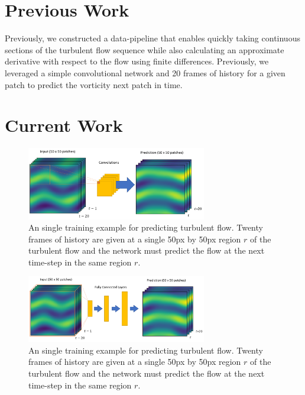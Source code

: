 \documentclass[10pt,letterpaper]{article}
\author{Brandon Houghton}
\begin{document}
	


\section{Previous Work}
Previously, we constructed a data-pipeline that enables quickly taking continuous sections of the turbulent flow sequence while also calculating an approximate derivative with respect to the flow using finite differences.
Previously, we leveraged a simple convolutional network and 20 frames of history for a given patch to predict the vorticity next patch in time. 

\section{Current Work}


\begin{figure}
	\begin{center}
		\includegraphics[width=0.7\textwidth]{images/network_conv.PNG}
		\caption{\small An single training example for predicting turbulent flow. Twenty frames of history are given at a single 50px by 50px region $r$ of the turbulent flow and the network must predict the flow at the next time-step in the same region $r$.}
		\label{setup}
	\end{center}	
\end{figure}

\begin{figure}
	\begin{center}
		\includegraphics[width=0.7\textwidth]{images/network_fc.PNG}
		\caption{\small An single training example for predicting turbulent flow. Twenty frames of history are given at a single 50px by 50px region $r$ of the turbulent flow and the network must predict the flow at the next time-step in the same region $r$.}
		\label{setup}
	\end{center}	
\end{figure}
\end{document}
